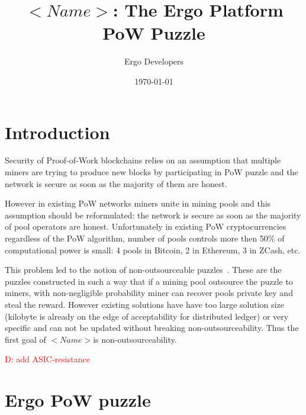 \documentclass[]{article}
\newcommand{\dnote}[1]{\textcolor{red}{D: {#1}}}
\newcommand{\Name}{$<Name>$}
\begin{document}
    \title{\Name: The Ergo Platform PoW Puzzle}

    \author{Ergo Developers}

    \date{\today}
    \maketitle



    \section{Introduction}

    Security of Proof-of-Work blockchains relies on an assumption
    that multiple miners are trying to produce new blocks by
    participating in PoW puzzle and the network is secure as soon as the
    majority of them are honest.

    However in existing PoW networks miners unite in mining pools and
    this assumption should be reformulated: the network is secure as soon as the
    majority of pool operators are honest.
    Unfortunately in existing PoW cryptocurrencies
    regardless of the PoW algorithm, number of pools controls more then 50\% of
    computational power is small: 4 pools in Bitcoin, 2 in Ethereum, 3 in ZCash, etc.

    This problem led to the notion of non-outsourceable puzzles~\cite{miller2015nonoutsourceable,daian2017piecework}.
    These are the puzzles constructed in such a way that if a mining pool outsource the puzzle
    to miners, with non-negligible probability miner can recover pools private key and steal the reward.
    However existing solutions have have too large solution size (kilobyte is already
    on the edge of acceptability for distributed ledger) or very specific and
    can not be updated without breaking non-outsourceability. Thus the first goal of \Name is non-outsourceability.

    \dnote{add ASIC-resistance}

    \section{Ergo PoW puzzle}
\end{document}
